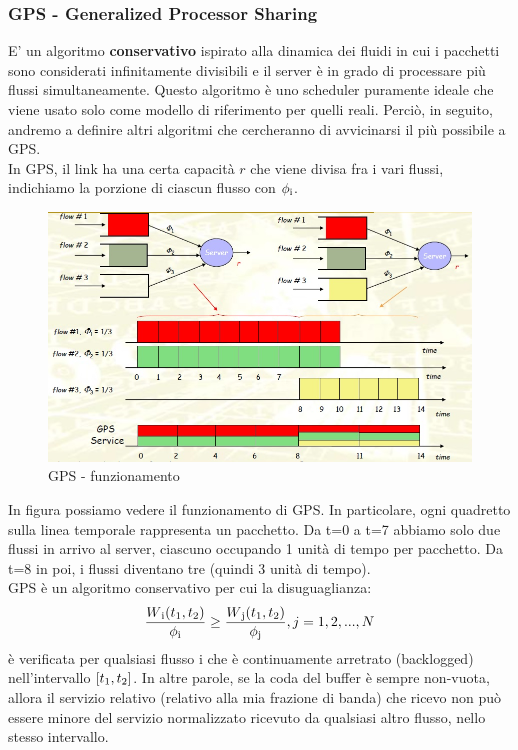 \documentclass{article}
\begin{document}
\subsubsection{GPS - Generalized Processor Sharing}
E' un algoritmo \textbf{conservativo} ispirato alla dinamica dei fluidi in cui i pacchetti sono considerati infinitamente divisibili e il server è in grado di processare più flussi simultaneamente. Questo algoritmo è uno scheduler puramente ideale che viene usato solo come modello di riferimento per quelli reali. Perciò, in seguito, andremo a definire altri algoritmi che cercheranno di avvicinarsi il più possibile a GPS. \\
In GPS, il link ha una certa capacità \( r\) che viene divisa fra i vari flussi, indichiamo la porzione di ciascun flusso con \( \phi\textsubscript{i} \).\\
\begin{figure}[H]
    \centering
    \includegraphics[scale=0.5]{figures/gps.jpg}
    \caption{GPS - funzionamento}
\end{figure}
\noindent In figura possiamo vedere il funzionamento di GPS. In particolare, ogni quadretto sulla linea temporale rappresenta un pacchetto. Da t=0 a t=7 abbiamo solo due flussi in arrivo al server, ciascuno occupando 1 unità di tempo per pacchetto. Da t=8 in poi, i flussi diventano tre (quindi 3 unità di tempo).\\
GPS è un algoritmo conservativo per cui la disuguaglianza:\\
\[ \displaystyle \frac{W\textsubscript{i}(t\textsubscript{1}, t\textsubscript{2})}{\phi\textsubscript{i}} \geq \frac{W\textsubscript{j}(t\textsubscript{1}, t\textsubscript{2})}{\phi\textsubscript{j}}, j=1,2,...,N
\]
è verificata per qualsiasi flusso i che è continuamente arretrato (backlogged) nell'intervallo \( [t\textsubscript{1}, t\textsubscript{2}] \). In altre parole, se la coda del buffer è sempre non-vuota, allora il servizio relativo (relativo alla mia frazione di banda) che ricevo non può essere minore del servizio normalizzato ricevuto da qualsiasi altro flusso, nello stesso intervallo.\\
\end{document}

